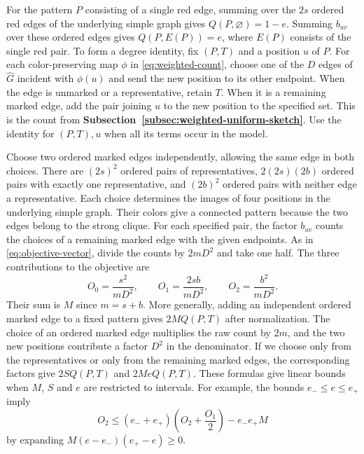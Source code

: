 \documentclass[preprint,11pt,numbers]{elsarticle-arxiv}
\numberwithin{equation}{section}
\theoremstyle{definition}
\begin{document}
For the pattern $P$ consisting of a single red edge, summing over the
$2s$ ordered red edges of the underlying simple graph gives
$Q(P,\varnothing)=1-e$. Summing $b_{uv}$ over these ordered edges
gives $Q(P,E(P))=e$, where $E(P)$ consists of the single red pair.
To form a degree identity, fix $(P,T)$ and a position $u$ of $P$.
For each color-preserving map $\phi$ in \eqref{eq:weighted-count},
choose one of the $D$ edges of $\widehat G$ incident with $\phi(u)$
and send the new position to its other endpoint. When the edge is
unmarked or a representative, retain $T$. When it is a remaining
marked edge, add the pair joining $u$ to the new position to the
specified set. This is the count from
\textbf{Subsection~\ref{subsec:weighted-uniform-sketch}}. Use the
identity for $(P,T),u$ when all its terms occur in the model.

Choose two ordered marked edges independently, allowing the same
edge in both choices. There are $(2s)^2$ ordered pairs of
representatives, $2(2s)(2b)$ ordered pairs with exactly one
representative, and $(2b)^2$ ordered pairs with neither edge a
representative. Each choice determines the images of four positions
in the underlying simple graph. Their colors give a connected
pattern because the two edges belong to the strong clique.
For each specified pair, the factor $b_{uv}$ counts the choices of
a remaining marked edge with the given endpoints. As in
\eqref{eq:objective-vector}, divide the counts by $2mD^2$ and take
one half. The three contributions to the objective are
\[
 O_0=\frac{s^2}{mD^2},\qquad
 O_1=\frac{2sb}{mD^2},\qquad
 O_2=\frac{b^2}{mD^2}.
\]
Their sum is $M$ since $m=s+b$. More generally, adding an independent
ordered marked edge to a fixed pattern gives $2M Q(P,T)$ after
normalization. The choice of an ordered marked edge multiplies the
raw count by $2m$, and the two new positions contribute a factor
$D^2$ in the denominator. If we choose only from the representatives
or only from the remaining marked edges, the corresponding factors
give $2S Q(P,T)$ and $2Me Q(P,T)$. These formulas give linear bounds
when $M$, $S$ and $e$ are restricted to intervals.
For example, the bounds $e_-\le e\le e_+$ imply
\[
 O_2\le(e_-+e_+)\left(O_2+\frac{O_1}{2}\right)-e_-e_+M
\]
by expanding $M(e-e_-)(e_+-e)\ge0$.
\end{document}
